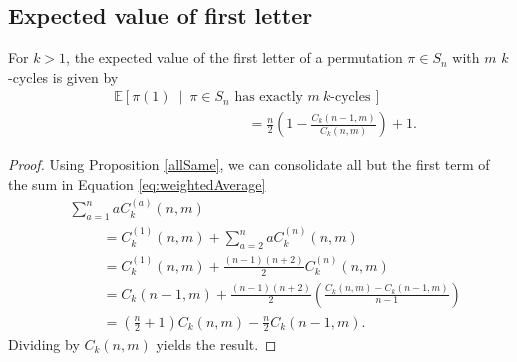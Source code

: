 \subsection{Expected value of first letter}
\begin{theorem}
  \label{firstTheorem}
  For $k > 1$, the expected value of the first letter of a permutation
  $\pi \in S_n$ with $m$ $k$-cycles is given by \begin{align}
    &\mathbb E[\pi(1)\ \mid\ \pi \in S_n \text{ has exactly } m\ k\text{-cycles}\,]
    \nonumber
    \\
    & \hspace{4cm} = \frac n2\left(1 - \frac{C_k(n-1,m)}{C_k(n,m)}\right) + 1.
  \end{align}
\end{theorem}
\begin{proof}
  Using Proposition \ref{allSame}, we can consolidate all but the first term of
  the sum in Equation \ref{eq:weightedAverage} \begin{align}
    &\sum_{a = 1}^n aC_k^{(a)}(n, m) \\
    &\hspace{1cm}= C_k^{(1)}(n,m) + \sum_{a = 2}^n aC_k^{(n)}(n, m) \\
    &\hspace{1cm}= C_k^{(1)}(n,m) + \frac{(n-1)(n+2)}{2} C_k^{(n)}(n, m) \\
    &\hspace{1cm}=
    C_k(n-1,m) + \frac{(n-1)(n+2)}{2}\left(
      \frac{C_k(n, m) - C_k(n-1, m)}{n - 1}
    \right) \\
    &\hspace{1cm}= \left(\frac{n}{2} + 1\right) C_k(n,m) - \frac n2C_k(n-1,m).
  \end{align}
  Dividing by $C_k(n,m)$ yields the result.
\end{proof}
